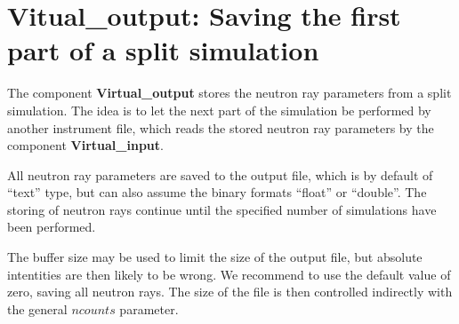 \section{Vitual\_output: Saving the first part of a split simulation}
\label{virtual_output}


The component {\bf Virtual\_output} stores the neutron ray parameters
from a split simulation. The idea is to let the
next part of the simulation be performed by another instrument file,
which reads the stored neutron ray
parameters by the component {\bf Virtual\_input}.

All neutron ray parameters are saved to the output file, which is by default
of ``text'' type, but can also assume the binary formats
``float'' or ``double''. The storing of neutron rays continue until the
specified number of simulations have been performed.

The buffer size may be used to limit the size of the output file, but 
absolute intentities are then likely to be wrong. 
We recommend to use the default value of zero, saving all neutron rays. 
The size of the file is then controlled indirectly with 
the general $ncounts$ parameter.
